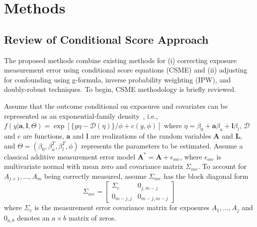 \documentclass[useAMS,usenatbib,referee]{biom}
\begin{document}
\section{Methods}
\label{s:methods}

\subsection{Review of Conditional Score Approach}

The proposed methods combine existing methods for (i) correcting exposure measurement error using conditional score equations (CSME) and (ii) adjusting for confounding using g-formula, inverse probability weighting (IPW), and doubly-robust techniques. To begin, CSME methodology is briefly reviewed.

Assume that the outcome conditional on exposures and covariates can be represented as an exponential-family density~\citep{mccullagh2018}, i.e., $f(y | \bm{a}, \bm{l}, \Theta) = \exp [ \{y\eta - \mathcal{D}(\eta)\}/ \phi + c(y, \phi) ]$ where $\eta = \beta_{0} + \bm{a}\beta_{a} + \bm{l}\beta_{l}$, $\mathcal{D}$ and $c$ are functions, $\bm{a}$ and $\bm{l}$ are realizations of the random variables $\bm{A}$ and $\bm{L}$, and $\Theta = (\beta_{0}, \beta^{T}_{a}, \beta^{T}_{l}, \phi)$ represents the parameters to be estimated. Assume a classical additive measurement error model $\bm{A}^{*} = \bm{A} + \epsilon_{me}$, where $\epsilon_{me}$ is multivariate normal with mean zero and covariance matrix $\Sigma_{me}$. To account for $A_{j+1}, ...,  A_{m}$ being correctly measured, assume $\Sigma_{me}$ has the block diagonal form
\begin{equation*}
    \Sigma_{me} =
    \begin{bmatrix}
    \Sigma_{e} & 0_{j,m-j} \\
    0_{m-j,j} & 0_{m-j,m-j}
    \end{bmatrix}
\end{equation*}
where $\Sigma_{e}$ is the measurement error covariance matrix for exposures $A_{1},...,A_{j}$ and $0_{a,b}$ denotes an $a \times b$ matrix of zeros.
\end{document}
